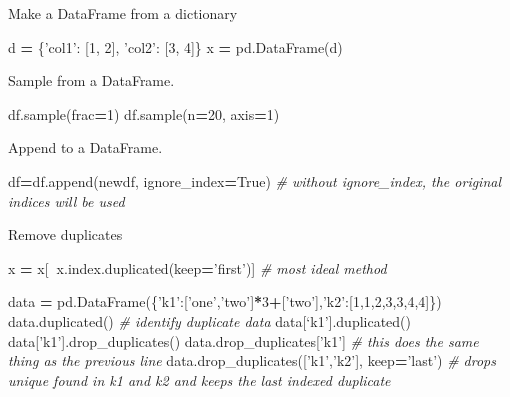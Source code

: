 \documentclass[]{book}
\newenvironment{Shaded}{\begin{snugshade}}{\end{snugshade}}
\newcommand{\DecValTok}[1]{\textcolor[rgb]{0.00,0.00,0.81}{#1}}
\newcommand{\StringTok}[1]{\textcolor[rgb]{0.31,0.60,0.02}{#1}}
\newcommand{\CommentTok}[1]{\textcolor[rgb]{0.56,0.35,0.01}{\textit{#1}}}
\newcommand{\VariableTok}[1]{\textcolor[rgb]{0.00,0.00,0.00}{#1}}
\newcommand{\OperatorTok}[1]{\textcolor[rgb]{0.81,0.36,0.00}{\textbf{#1}}}
\newcommand{\NormalTok}[1]{#1}
\begin{document}
Make a DataFrame from a dictionary

\begin{Shaded}
\begin{Highlighting}[]
\NormalTok{d }\OperatorTok{=}\NormalTok{ \{}\StringTok{'col1'}\NormalTok{: [}\DecValTok{1}\NormalTok{, }\DecValTok{2}\NormalTok{], }\StringTok{'col2'}\NormalTok{: [}\DecValTok{3}\NormalTok{, }\DecValTok{4}\NormalTok{]\}}
\NormalTok{x }\OperatorTok{=}\NormalTok{ pd.DataFrame(d)}
\end{Highlighting}
\end{Shaded}

Sample from a DataFrame.

\begin{Shaded}
\begin{Highlighting}[]
\NormalTok{df.sample(frac}\OperatorTok{=}\DecValTok{1}\NormalTok{)}
\NormalTok{df.sample(n}\OperatorTok{=}\DecValTok{20}\NormalTok{, axis}\OperatorTok{=}\DecValTok{1}\NormalTok{)}
\end{Highlighting}
\end{Shaded}

Append to a DataFrame.

\begin{Shaded}
\begin{Highlighting}[]
\NormalTok{df}\OperatorTok{=}\NormalTok{df.append(newdf, ignore_index}\OperatorTok{=}\VariableTok{True}\NormalTok{) }\CommentTok{# without ignore_index, the original indices will be used}
\end{Highlighting}
\end{Shaded}

Remove duplicates

\begin{Shaded}
\begin{Highlighting}[]
\NormalTok{x }\OperatorTok{=}\NormalTok{ x[}\OperatorTok{~}\NormalTok{x.index.duplicated(keep}\OperatorTok{=}\StringTok{'first'}\NormalTok{)] }\CommentTok{# most ideal method}

\NormalTok{data }\OperatorTok{=}\NormalTok{ pd.DataFrame(\{}\StringTok{'k1'}\NormalTok{:[}\StringTok{'one'}\NormalTok{,}\StringTok{'two'}\NormalTok{]}\OperatorTok{*}\DecValTok{3}\OperatorTok{+}\NormalTok{[}\StringTok{'two'}\NormalTok{],}\StringTok{'k2'}\NormalTok{:[}\DecValTok{1}\NormalTok{,}\DecValTok{1}\NormalTok{,}\DecValTok{2}\NormalTok{,}\DecValTok{3}\NormalTok{,}\DecValTok{3}\NormalTok{,}\DecValTok{4}\NormalTok{,}\DecValTok{4}\NormalTok{]\})}
\NormalTok{data.duplicated() }\CommentTok{# identify duplicate data}
\NormalTok{data[‘k1’].duplicated()}
\NormalTok{data[}\StringTok{'k1'}\NormalTok{].drop_duplicates()}
\NormalTok{data.drop_duplicates[}\StringTok{'k1'}\NormalTok{] }\CommentTok{# this does the same thing as the previous line}
\NormalTok{data.drop_duplicates([}\StringTok{'k1'}\NormalTok{,}\StringTok{'k2'}\NormalTok{], keep}\OperatorTok{=}\StringTok{'last'}\NormalTok{) }\CommentTok{# drops unique found in k1 and k2 and keeps the last indexed duplicate}
\end{Highlighting}
\end{Shaded}
\end{document}
